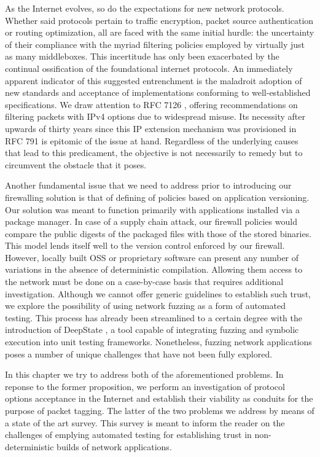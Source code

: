 As the Internet evolves, so do the expectations for new network protocols. Whether said protocols pertain to traffic encryption, packet source authentication or routing optimization, all are faced with the same initial hurdle: the uncertainty of their compliance with the myriad filtering policies employed by virtually just as many middleboxes. This incertitude has only been exacerbated by the continual ossification of the foundational internet protocols. An immediately apparent indicator of this suggested entrenchment is the maladroit adoption of new standards and acceptance of implementations conforming to well-established specifications. We draw attention to RFC 7126 \cite{RFC7126}, offering recommendations on filtering packets with IPv4 options due to widespread misuse. Its necessity after upwards of thirty years since this IP extension mechanism was provisioned in RFC 791 \cite{RFC0791} is epitomic of the issue at hand. Regardless of the underlying causes that lead to this predicament, the objective is not necessarily to remedy but to circumvent the obstacle that it poses.

Another fundamental issue that we need to address prior to introducing our firewalling solution is that of defining of policies based on application versioning. Our solution was meant to function primarily with applications installed via a package manager. In case of a supply chain attack, our firewall policies would compare the public digests of the packaged files with those of the stored binaries. This model lends itself well to the version control enforced by our firewall. However, locally built OSS or proprietary software can present any number of variations in the absence of deterministic compilation. Allowing them access to the network must be done on a case-by-case basis that requires additional investigation. Although we cannot offer generic guidelines to establish such trust, we explore the possibility of using network fuzzing as a form of automated testing. This process has already been streamlined to a certain degree with the introduction of DeepState \cite{goodman2018deepstate}, a tool capable of integrating fuzzing and symbolic execution into unit testing frameworks. Nonetheless, fuzzing network applications poses a number of unique challenges that have not been fully explored.

In this chapter we try to address both of the aforementioned problems. In reponse to the former proposition, we perform an investigation of protocol options acceptance in the Internet and establish their viability as conduits for the purpose of packet tagging. The latter of the two problems we address by means of a state of the art survey. This survey is meant to inform the reader on the challenges of emplying automated testing for establishing trust in non-deterministic builds of network applications.
